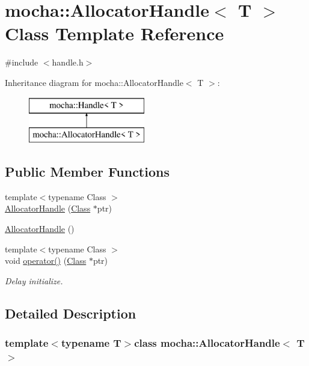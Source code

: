 \hypertarget{classmocha_1_1_allocator_handle}{
\section{mocha::AllocatorHandle$<$ T $>$ Class Template Reference}
\label{classmocha_1_1_allocator_handle}
}


{\ttfamily \#include $<$handle.h$>$}

Inheritance diagram for mocha::AllocatorHandle$<$ T $>$:\begin{figure}[H]
\begin{center}
\leavevmode
\includegraphics[height=2.000000cm]{classmocha_1_1_allocator_handle}
\end{center}
\end{figure}
\subsection*{Public Member Functions}
\begin{DoxyCompactItemize}
\item 
{\footnotesize template$<$typename Class $>$ }\\\hyperlink{classmocha_1_1_allocator_handle_a7ce28871d59f5f41c28e0f7e6aecbf13}{AllocatorHandle} (\hyperlink{classmocha_1_1_class}{Class} $\ast$ptr)
\item 
\hyperlink{classmocha_1_1_allocator_handle_a6ef49943e2e2f0bfd2621e56de3d9dac}{AllocatorHandle} ()
\item 
{\footnotesize template$<$typename Class $>$ }\\void \hyperlink{classmocha_1_1_allocator_handle_a17373eff1ea33be27713d9a3fa06ce0d}{operator()} (\hyperlink{classmocha_1_1_class}{Class} $\ast$ptr)
\begin{DoxyCompactList}\small\item\em Delay initialize. \end{DoxyCompactList}\end{DoxyCompactItemize}


\subsection{Detailed Description}
\subsubsection*{template$<$typename T$>$class mocha::AllocatorHandle$<$ T $>$}



